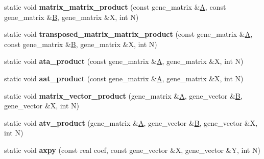 \begin{DoxyCompactItemize}
static void {\bfseries matrix\+\_\+matrix\+\_\+product} (const gene\+\_\+matrix \&\hyperlink{group___core___module_class_eigen_1_1_matrix}{A}, const gene\+\_\+matrix \&\hyperlink{group___core___module_class_eigen_1_1_matrix}{B}, gene\+\_\+matrix \&X, int N)
\item 
\mbox{\label{classgmm__interface_a8a4ee623e9b3b3e51bf8ddb423463f41}} 
static void {\bfseries transposed\+\_\+matrix\+\_\+matrix\+\_\+product} (const gene\+\_\+matrix \&\hyperlink{group___core___module_class_eigen_1_1_matrix}{A}, const gene\+\_\+matrix \&\hyperlink{group___core___module_class_eigen_1_1_matrix}{B}, gene\+\_\+matrix \&X, int N)
\item 
\mbox{\label{classgmm__interface_adf15f35fd991837fb414f799623d3daf}} 
static void {\bfseries ata\+\_\+product} (const gene\+\_\+matrix \&\hyperlink{group___core___module_class_eigen_1_1_matrix}{A}, gene\+\_\+matrix \&X, int N)
\item 
\mbox{\label{classgmm__interface_a4757d90d58332b7198024841b403f7c5}} 
static void {\bfseries aat\+\_\+product} (const gene\+\_\+matrix \&\hyperlink{group___core___module_class_eigen_1_1_matrix}{A}, gene\+\_\+matrix \&X, int N)
\item 
\mbox{\label{classgmm__interface_a16dda411b3178039c1999ad1c9850ab8}} 
static void {\bfseries matrix\+\_\+vector\+\_\+product} (gene\+\_\+matrix \&\hyperlink{group___core___module_class_eigen_1_1_matrix}{A}, gene\+\_\+vector \&\hyperlink{group___core___module_class_eigen_1_1_matrix}{B}, gene\+\_\+vector \&X, int N)
\item 
\mbox{\label{classgmm__interface_a45360d829e5ef8588296e21bfd944f99}} 
static void {\bfseries atv\+\_\+product} (gene\+\_\+matrix \&\hyperlink{group___core___module_class_eigen_1_1_matrix}{A}, gene\+\_\+vector \&\hyperlink{group___core___module_class_eigen_1_1_matrix}{B}, gene\+\_\+vector \&X, int N)
\item 
\mbox{\label{classgmm__interface_a40e2c43541b9975952531d62e5396006}} 
static void {\bfseries axpy} (const real coef, const gene\+\_\+vector \&X, gene\+\_\+vector \&Y, int N)
\item 
\mbox{\label{classgmm__interface_abe2594eee753df865441080168cdfe8a}} 

\end{DoxyCompactItemize}
